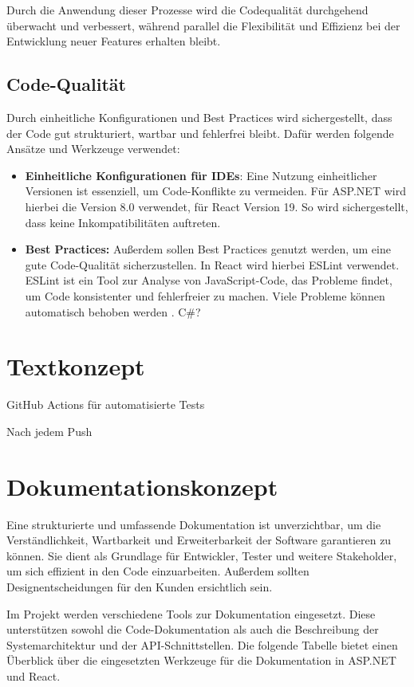 \documentclass[a4paper,12pt]{article}
\begin{document}
Durch die Anwendung dieser Prozesse wird die Codequalität durchgehend überwacht und verbessert, während parallel die Flexibilität und Effizienz bei der Entwicklung neuer Features erhalten bleibt.

\subsection{Code-Qualität}
Durch einheitliche Konfigurationen und Best Practices wird sichergestellt, dass der Code gut strukturiert, wartbar und fehlerfrei bleibt. Dafür werden folgende Ansätze und Werkzeuge verwendet:

\begin{itemize}
    \item \textbf{Einheitliche Konfigurationen für IDEs}: Eine Nutzung einheitlicher Versionen ist essenziell, um Code-Konflikte zu vermeiden. Für \mbox{ASP.NET} wird hierbei die Version 8.0 verwendet, für React Version 19. So wird sichergestellt, dass keine Inkompatibilitäten auftreten.
    \item \textbf{Best Practices:} Außerdem sollen Best Practices genutzt werden, um eine gute Code-Qualität sicherzustellen. In React wird hierbei ESLint verwendet. ESLint ist ein Tool zur Analyse von JavaScript-Code, das Probleme findet, um Code konsistenter und fehlerfreier zu machen. Viele Probleme können automatisch behoben werden \cite{eslint_find_2025}. C\#?
\end{itemize}

\section{Textkonzept}
GitHub Actions für automatisierte Tests

Nach jedem Push 

\section{Dokumentationskonzept}

Eine strukturierte und umfassende Dokumentation ist unverzichtbar, um die Verständlichkeit, Wartbarkeit und Erweiterbarkeit der Software garantieren zu können. Sie dient als Grundlage für Entwickler, Tester und weitere Stakeholder, um sich effizient in den Code einzuarbeiten. Außerdem sollten Designentscheidungen für den Kunden ersichtlich sein.

Im Projekt werden verschiedene Tools zur Dokumentation eingesetzt. Diese unterstützen sowohl die Code-Dokumentation als auch die Beschreibung der Systemarchitektur und der API-Schnittstellen. Die folgende Tabelle bietet einen Überblick über die eingesetzten Werkzeuge für die Dokumentation in \mbox{ASP.NET} und React.
\end{document}
